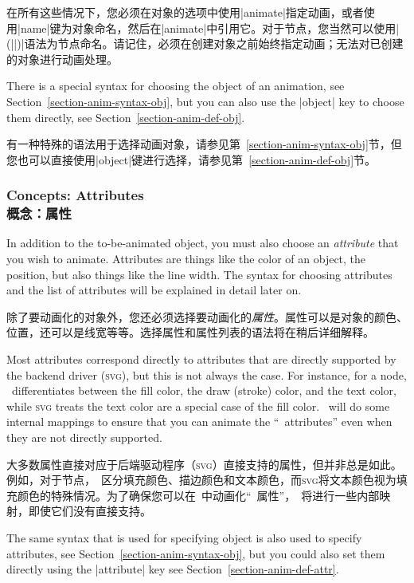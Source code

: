 在所有这些情况下，您必须在对象的选项中使用|animate|指定动画，或者使用|name|键为对象命名，然后在|animate|中引用它。对于节点，您当然可以使用|(||)|语法为节点命名。请记住，必须在创建对象之前始终指定动画；无法对已创建的对象进行动画处理。

There is a special syntax for choosing the object of an animation, see
Section~\ref{section-anim-syntax-obj}, but you can also use the |object| key to
choose them directly, see Section~\ref{section-anim-def-obj}.

有一种特殊的语法用于选择动画对象，请参见第~\ref{section-anim-syntax-obj}节，但您也可以直接使用|object|键进行选择，请参见第~\ref{section-anim-def-obj}节。


\subsubsection{Concepts: Attributes\\概念：属性}

In addition to the to-be-animated object, you must also choose an
\emph{attribute} that you wish to animate. Attributes are things like the color
of an object, the position, but also things like the line width. The syntax for
choosing attributes and the list of attributes will be explained in detail
later on.

除了要动画化的对象外，您还必须选择要动画化的\emph{属性}。属性可以是对象的颜色、位置，还可以是线宽等等。选择属性和属性列表的语法将在稍后详细解释。

Most attributes correspond directly to attributes that are directly supported
by the backend driver (\textsc{svg}), but this is not always the case. For
instance, for a node, \tikzname\ differentiates between the fill color, the
draw (stroke) color, and the text color, while \textsc{svg} treats the text
color are a special case of the fill color. \tikzname\ will do some internal
mappings to ensure that you can animate the ``\tikzname\ attributes'' even when
they are not directly supported.

大多数属性直接对应于后端驱动程序（\textsc{svg}）直接支持的属性，但并非总是如此。例如，对于节点，\tikzname\ 区分填充颜色、描边颜色和文本颜色，而\textsc{svg}将文本颜色视为填充颜色的特殊情况。为了确保您可以在\tikzname\ 中动画化“\tikzname\ 属性”，\tikzname\ 将进行一些内部映射，即使它们没有直接支持。

The same syntax that is used for specifying object is also used to specify
attributes, see Section~\ref{section-anim-syntax-obj}, but you could also set
them directly using the |attribute| key see
Section~\ref{section-anim-def-attr}.


